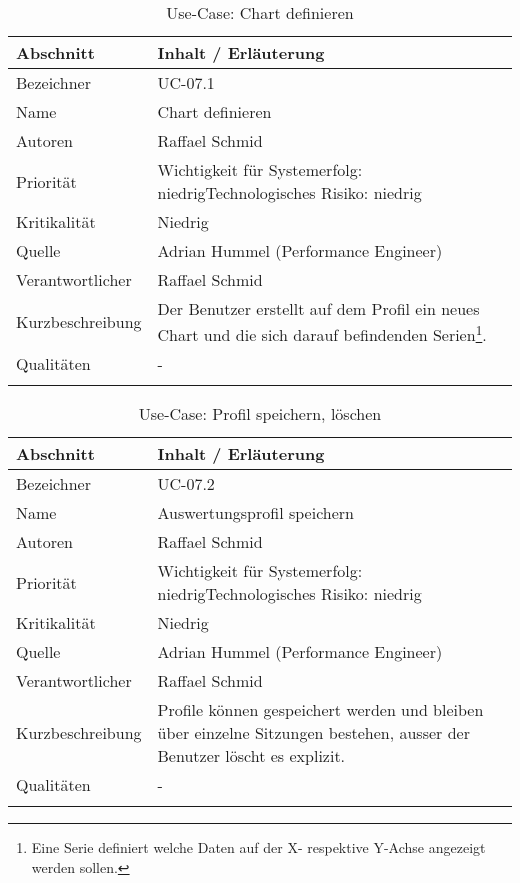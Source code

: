 \begin{longtable}{|p{4cm}|p{10.5cm}|}
\hline
   \textbf{Abschnitt} & \textbf{Inhalt / Erläuterung} \\\hline
   Bezeichner & UC-07.1\\\hline
   Name & Chart definieren\\\hline
   Autoren & Raffael Schmid\\\hline
   Priorität & Wichtigkeit für Systemerfolg: niedrig\newline Technologisches Risiko: niedrig\\\hline
   Kritikalität & Niedrig\\\hline
   Quelle & Adrian Hummel (Performance Engineer)\\\hline
   Verantwortlicher & Raffael Schmid\\\hline
   Kurzbeschreibung & Der Benutzer erstellt auf dem Profil ein neues Chart und die sich darauf befindenden Serien\footnote{Eine Serie definiert welche Daten auf der X- respektive Y-Achse angezeigt werden sollen.}.\\\hline
   Qualitäten & -\\\hline
\caption{Use-Case: Chart definieren }
\end{longtable}

\begin{longtable}{|p{4cm}|p{10.5cm}|}
\hline
   \textbf{Abschnitt} & \textbf{Inhalt / Erläuterung} \\\hline
   Bezeichner & UC-07.2\\\hline
   Name & Auswertungsprofil speichern\\\hline
   Autoren & Raffael Schmid\\\hline
   Priorität & Wichtigkeit für Systemerfolg: niedrig\newline Technologisches Risiko: niedrig\\\hline
   Kritikalität & Niedrig\\\hline
   Quelle & Adrian Hummel (Performance Engineer)\\\hline
   Verantwortlicher & Raffael Schmid\\\hline
   Kurzbeschreibung & Profile können gespeichert werden und bleiben über einzelne Sitzungen bestehen, ausser der Benutzer löscht es explizit.\\\hline
   Qualitäten & -\\\hline
\caption{Use-Case: Profil speichern, löschen }
\end{longtable}

